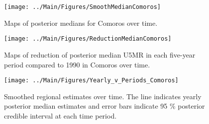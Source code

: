 \documentclass[12pt]{article}\usepackage[]{graphicx}\usepackage[]{color}
\newenvironment{knitrout}{}{} %
\begin{document}
\begin{knitrout}
\color{fgcolor}\begin{figure}[bht]

{\centering \texttt{[image: ../Main/Figures/SmoothMedianComoros]} 

}

\caption[Maps of posterior medians for Comoros  over time]{Maps of posterior medians for Comoros  over time.}\label{fig:unnamed-chunk-64}
\end{figure}


\end{knitrout}
\begin{knitrout}
\color{fgcolor}\begin{figure}[bht]

{\centering \texttt{[image: ../Main/Figures/ReductionMedianComoros]} 

}

\caption[Maps of reduction of posterior median U5MR in each five-year period compared to 1990 in Comoros over time]{Maps of reduction of posterior median U5MR in each five-year period compared to 1990 in Comoros over time.}\label{fig:unnamed-chunk-65}
\end{figure}


\end{knitrout}
\begin{knitrout}
\color{fgcolor}\begin{figure}[bht]

{\centering \texttt{[image: ../Main/Figures/Yearly\_v\_Periods\_Comoros]} 

}

\caption[Smoothed regional estimates over time]{Smoothed regional estimates over time. The line indicates yearly posterior median estimates and error bars indicate 95 \% posterior credible interval at each time period.}\label{fig:unnamed-chunk-66}
\end{figure}


\end{knitrout}
\end{document}
